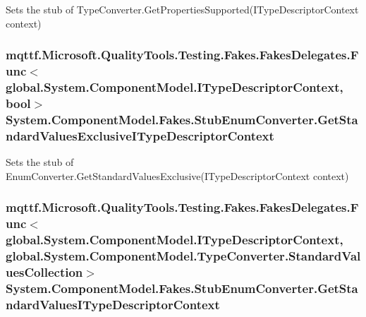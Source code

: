 Sets the stub of Type\-Converter.\-Get\-Properties\-Supported(\-I\-Type\-Descriptor\-Context context)

\hypertarget{class_system_1_1_component_model_1_1_fakes_1_1_stub_enum_converter_a82ab6b9e75b7ffd16240934a3004eaaa}{
\subsubsection[{Get\-Standard\-Values\-Exclusive\-I\-Type\-Descriptor\-Context}]{\setlength{\rightskip}{0pt plus 5cm}mqttf.\-Microsoft.\-Quality\-Tools.\-Testing.\-Fakes.\-Fakes\-Delegates.\-Func$<$global.\-System.\-Component\-Model.\-I\-Type\-Descriptor\-Context, bool$>$ System.\-Component\-Model.\-Fakes.\-Stub\-Enum\-Converter.\-Get\-Standard\-Values\-Exclusive\-I\-Type\-Descriptor\-Context}}\label{class_system_1_1_component_model_1_1_fakes_1_1_stub_enum_converter_a82ab6b9e75b7ffd16240934a3004eaaa}


Sets the stub of Enum\-Converter.\-Get\-Standard\-Values\-Exclusive(\-I\-Type\-Descriptor\-Context context)

\hypertarget{class_system_1_1_component_model_1_1_fakes_1_1_stub_enum_converter_a18ee63d2427a28066a8b49f9a99e19cc}{
\subsubsection[{Get\-Standard\-Values\-I\-Type\-Descriptor\-Context}]{\setlength{\rightskip}{0pt plus 5cm}mqttf.\-Microsoft.\-Quality\-Tools.\-Testing.\-Fakes.\-Fakes\-Delegates.\-Func$<$global.\-System.\-Component\-Model.\-I\-Type\-Descriptor\-Context, global.\-System.\-Component\-Model.\-Type\-Converter.\-Standard\-Values\-Collection$>$ System.\-Component\-Model.\-Fakes.\-Stub\-Enum\-Converter.\-Get\-Standard\-Values\-I\-Type\-Descriptor\-Context}}\label{class_system_1_1_component_model_1_1_fakes_1_1_stub_enum_converter_a18ee63d2427a28066a8b49f9a99e19cc}


